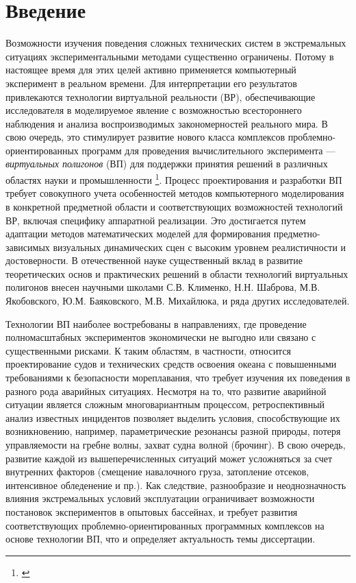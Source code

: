 \chapter*{Введение}

Возможности изучения поведения сложных технических систем в экстремальных ситуациях экспериментальными
 методами существенно ограничены. Потому в настоящее время для этих целей активно применяется компьютерный
 эксперимент в реальном времени. Для интерпретации его результатов привлекаются технологии виртуальной
 реальности (ВР), обеспечивающие  исследователя в моделируемое явление с возможностью 
всестороннего наблюдения и анализа воспроизводимых закономерностей реального мира. В свою очередь, 
это стимулирует развитие нового класса комплексов проблемно-ориентированных программ для проведения
 вычислительного эксперимента –-- \textit{виртуальных полигонов} (ВП) для поддержки принятия решений в различных 
 областях науки и промышленности \footnote{ \citep{sloot111} }. Процесс проектирования и разработки ВП требует совокупного учета особенностей методов компьютерного моделирования в конкретной предметной области и соответствующих возможностей технологий ВР, включая специфику аппаратной реализации. Это достигается путем адаптации 
 методов математических моделей для формирования предметно-зависимых визуальных динамических сцен с 
 высоким уровнем реалистичности и достоверности. В отечественной науке существенный вклад в развитие 
 теоретических основ и практических решений в области технологий виртуальных полигонов внесен научными школами С.В. Клименко, Н.Н. Шаброва, М.В. Якобовского, Ю.М. Баяковского, М.В. Михайлюка, и ряда других исследователей.
 
 
Технологии ВП наиболее востребованы в направлениях, где проведение полномасштабных экспериментов экономически не выгодно или связано с существенными рисками. К таким областям, в частности, относится проектирование судов и технических средств освоения океана с повышенными требованиями к безопасности мореплавания, что требует изучения их поведения в разного рода аварийных ситуациях. Несмотря на то, что развитие аварийной ситуации является сложным многовариантным процессом, ретроспективный анализ известных инцидентов позволяет выделить условия, способствующие их возникновению, например, параметрические резонансы разной природы, потеря управляемости на гребне волны, захват судна волной (брочинг). В свою очередь, развитие каждой из вышеперечисленных ситуаций может усложняться за счет внутренних факторов (смещение навалочного груза, затопление отсеков, интенсивное обледенение и пр.). Как следствие, разнообразие и неоднозначность влияния экстремальных условий эксплуатации ограничивает возможности постановок экспериментов в опытовых бассейнах, и требует развития соответствующих проблемно-ориентированных программных комплексов на основе технологии ВП, что и определяет актуальность темы диссертации.

